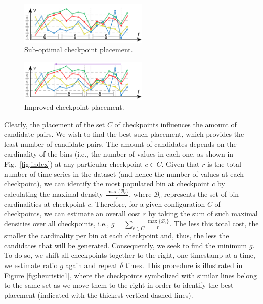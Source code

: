 \begin{figure}[!tb]
    \centering
    \includegraphics[width=0.55\textwidth]{figures/sub_opt.png}
    \caption{Sub-optimal checkpoint placement.}
    \label{fig:opt1}
\end{figure}

\begin{figure}[!tb]
    \centering
    \includegraphics[width=0.55\textwidth]{figures/opt.png}
    \caption{Improved checkpoint placement.}
    \label{fig:opt2}
\end{figure}

Clearly, the placement of the set $C$ of checkpoints influences the amount of candidate pairs. We wish to find the best such placement, which provides the least number of candidate pairs. The amount of candidates depends on the cardinality of the bins (i.e., the number of values in each one, as shown in Fig.~\ref{fig:index}) at any particular checkpoint $c \in C$. Given that $r$ is the total number of time series in the dataset (and hence the number of values at each checkpoint), we can identify the most populated bin at checkpoint $c$ by calculating the maximal density $\frac{\max\{\mathcal{B}_{c}\}}{r}$, where $\mathcal{B}_{c}$ represents the set of bin cardinalities at checkpoint $c$. Therefore, for a given configuration $C$ of checkpoints, we can estimate an overall cost $r$ by taking the sum of such maximal densities over all checkpoints, i.e.,  $g=\sum_{c \in C}{\frac{\max\{\mathcal{B}_{c}\}}{r}}$. The less this total cost, the smaller the cardinality per bin at each checkpoint and, thus, the less the candidates that will be generated. Consequently, we seek to find the minimum $g$. To do so, we shift all checkpoints together to the right, one timestamp at a time, we estimate ratio $g$ again and repeat $\delta$ times. This procedure is illustrated in Figure \ref{fig:heuristic1}, where the checkpoints symbolized with similar lines belong to the same set as we move them to the right in order to identify the best placement (indicated with the thickest vertical dashed lines).

